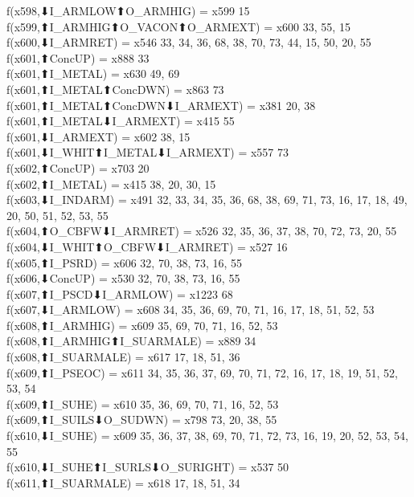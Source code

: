 f(x598,⬇I_ARMLOW⬆O_ARMHIG) = x599 {15} \\
f(x599,⬆I_ARMHIG⬆O_VACON⬆O_ARMEXT) = x600 {33, 55, 15} \\
f(x600,⬇I_ARMRET) = x546 {33, 34, 36, 68, 38, 70, 73, 44, 15, 50, 20, 55} \\
f(x601,⬆ConcUP) = x888 {33} \\
f(x601,⬆I_METAL) = x630 {49, 69} \\
f(x601,⬆I_METAL⬆ConcDWN) = x863 {73} \\
f(x601,⬆I_METAL⬆ConcDWN⬇I_ARMEXT) = x381 {20, 38} \\
f(x601,⬆I_METAL⬇I_ARMEXT) = x415 {55} \\
f(x601,⬇I_ARMEXT) = x602 {38, 15} \\
f(x601,⬇I_WHIT⬆I_METAL⬇I_ARMEXT) = x557 {73} \\
f(x602,⬆ConcUP) = x703 {20} \\
f(x602,⬆I_METAL) = x415 {38, 20, 30, 15} \\
f(x603,⬇I_INDARM) = x491 {32, 33, 34, 35, 36, 68, 38, 69, 71, 73, 16, 17, 18, 49, 20, 50, 51, 52, 53, 55} \\
f(x604,⬆O_CBFW⬇I_ARMRET) = x526 {32, 35, 36, 37, 38, 70, 72, 73, 20, 55} \\
f(x604,⬇I_WHIT⬆O_CBFW⬇I_ARMRET) = x527 {16} \\
f(x605,⬆I_PSRD) = x606 {32, 70, 38, 73, 16, 55} \\
f(x606,⬇ConcUP) = x530 {32, 70, 38, 73, 16, 55} \\
f(x607,⬆I_PSCD⬇I_ARMLOW) = x1223 {68} \\
f(x607,⬇I_ARMLOW) = x608 {34, 35, 36, 69, 70, 71, 16, 17, 18, 51, 52, 53} \\
f(x608,⬆I_ARMHIG) = x609 {35, 69, 70, 71, 16, 52, 53} \\
f(x608,⬆I_ARMHIG⬆I_SUARMALE) = x889 {34} \\
f(x608,⬆I_SUARMALE) = x617 {17, 18, 51, 36} \\
f(x609,⬆I_PSEOC) = x611 {34, 35, 36, 37, 69, 70, 71, 72, 16, 17, 18, 19, 51, 52, 53, 54} \\
f(x609,⬆I_SUHE) = x610 {35, 36, 69, 70, 71, 16, 52, 53} \\
f(x609,⬆I_SUILS⬇O_SUDWN) = x798 {73, 20, 38, 55} \\
f(x610,⬇I_SUHE) = x609 {35, 36, 37, 38, 69, 70, 71, 72, 73, 16, 19, 20, 52, 53, 54, 55} \\
f(x610,⬇I_SUHE⬆I_SURLS⬇O_SURIGHT) = x537 {50} \\
f(x611,⬆I_SUARMALE) = x618 {17, 18, 51, 34} \\
